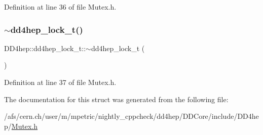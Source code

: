 Definition at line 36 of file Mutex.\+h.

\hypertarget{struct_d_d4hep_1_1dd4hep__lock__t_a2da5cda9c173175ccd3c52a2a7c31e85}{}\label{struct_d_d4hep_1_1dd4hep__lock__t_a2da5cda9c173175ccd3c52a2a7c31e85} 
\subsubsection{\texorpdfstring{$\sim$dd4hep\+\_\+lock\+\_\+t()}{~dd4hep\_lock\_t()}}
{\footnotesize\ttfamily D\+D4hep\+::dd4hep\+\_\+lock\+\_\+t\+::$\sim$dd4hep\+\_\+lock\+\_\+t (\begin{DoxyParamCaption}{ }\end{DoxyParamCaption})\hspace{0.3cm}{\ttfamily [inline]}}



Definition at line 37 of file Mutex.\+h.



The documentation for this struct was generated from the following file\+:\begin{DoxyCompactItemize}
\item 
/afs/cern.\+ch/user/m/mpetric/nightly\+\_\+cppcheck/dd4hep/\+D\+D\+Core/include/\+D\+D4hep/\hyperlink{_mutex_8h}{Mutex.\+h}\end{DoxyCompactItemize}
